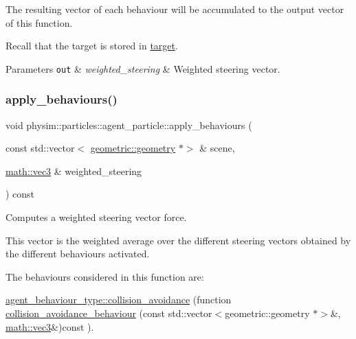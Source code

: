 The resulting vector of each behaviour will be accumulated to the output vector of this function.

Recall that the target is stored in \hyperlink{classphysim_1_1particles_1_1agent__particle_a0658207e11a5d39844856233ae8bf2cb}{target}. 
\begin{DoxyParams}[1]{Parameters}
\mbox{\tt out}  & {\em weighted\+\_\+steering} & Weighted steering vector. \\
\hline
\end{DoxyParams}
\mbox{\label{classphysim_1_1particles_1_1agent__particle_abd9976b5fd7b03ef4301878085e21fbc}} 
\subsubsection{\texorpdfstring{apply\+\_\+behaviours()}{apply\_behaviours()}\hspace{0.1cm}{\footnotesize\ttfamily [2/3]}}
{\footnotesize\ttfamily void physim\+::particles\+::agent\+\_\+particle\+::apply\+\_\+behaviours (\begin{DoxyParamCaption}\item[{const std\+::vector$<$ \hyperlink{classphysim_1_1geometric_1_1geometry}{geometric\+::geometry} $\ast$$>$ \&}]{scene,  }\item[{\hyperlink{structphysim_1_1math_1_1vec3}{math\+::vec3} \&}]{weighted\+\_\+steering }\end{DoxyParamCaption}) const}



Computes a weighted steering vector force. 

This vector is the weighted average over the different steering vectors obtained by the different behaviours activated.

The behaviours considered in this function are\+:
\begin{DoxyItemize}
\item \hyperlink{namespacephysim_1_1particles_a033757595f7862a0fc8a389d79bf9c88aa150bf2057adbf0518b8bd2a4019d5a4}{agent\+\_\+behaviour\+\_\+type\+::collision\+\_\+avoidance} (function \hyperlink{classphysim_1_1particles_1_1agent__particle_a776246cbbc1550db54368039db73d51b}{collision\+\_\+avoidance\+\_\+behaviour} (const std\+::vector$<$geometric\+::geometry $\ast$$>$\&, \hyperlink{structphysim_1_1math_1_1vec3}{math\+::vec3}\&)const ).
\end{DoxyItemize}

